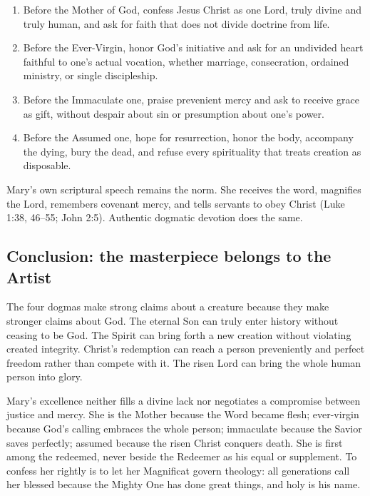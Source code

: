\begin{enumerate}
  \item Before the Mother of God, confess Jesus Christ as one Lord, truly divine and truly human, and ask for faith that does not divide doctrine from life.
  \item Before the Ever-Virgin, honor God's initiative and ask for an undivided heart faithful to one's actual vocation, whether marriage, consecration, ordained ministry, or single discipleship.
  \item Before the Immaculate one, praise prevenient mercy and ask to receive grace as gift, without despair about sin or presumption about one's power.
  \item Before the Assumed one, hope for resurrection, honor the body, accompany the dying, bury the dead, and refuse every spirituality that treats creation as disposable.
\end{enumerate}

Mary's own scriptural speech remains the norm. She receives the word, magnifies the Lord, remembers covenant mercy, and tells servants to obey Christ (Luke 1:38, 46--55; John 2:5). Authentic dogmatic devotion does the same.

\subsection{Conclusion: the masterpiece belongs to the Artist}

The four dogmas make strong claims about a creature because they make stronger claims about God. The eternal Son can truly enter history without ceasing to be God. The Spirit can bring forth a new creation without violating created integrity. Christ's redemption can reach a person preveniently and perfect freedom rather than compete with it. The risen Lord can bring the whole human person into glory.

Mary's excellence neither fills a divine lack nor negotiates a compromise between justice and mercy. She is the Mother because the Word became flesh; ever-virgin because God's calling embraces the whole person; immaculate because the Savior saves perfectly; assumed because the risen Christ conquers death. She is first among the redeemed, never beside the Redeemer as his equal or supplement. To confess her rightly is to let her Magnificat govern theology: all generations call her blessed because the Mighty One has done great things, and holy is his name.
